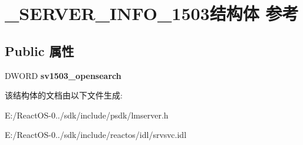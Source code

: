 \hypertarget{struct___s_e_r_v_e_r___i_n_f_o__1503}{}\section{\+\_\+\+S\+E\+R\+V\+E\+R\+\_\+\+I\+N\+F\+O\+\_\+1503结构体 参考}
\label{struct___s_e_r_v_e_r___i_n_f_o__1503}
\subsection*{Public 属性}
\begin{DoxyCompactItemize}
\item 
\mbox{\label{struct___s_e_r_v_e_r___i_n_f_o__1503_aa106e9a02d63b942c0fbbeaece5d15c5}} 
D\+W\+O\+RD {\bfseries sv1503\+\_\+opensearch}
\end{DoxyCompactItemize}


该结构体的文档由以下文件生成\+:\begin{DoxyCompactItemize}
\item 
E\+:/\+React\+O\+S-\/0../sdk/include/psdk/lmserver.\+h\item 
E\+:/\+React\+O\+S-\/0../sdk/include/reactos/idl/srvsvc.\+idl\end{DoxyCompactItemize}
